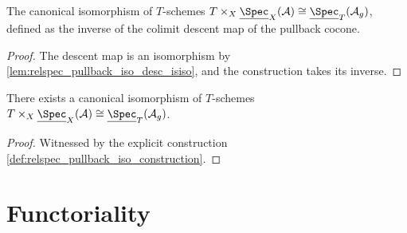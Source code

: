 \begin{definition}
  \label{def:relspec_pullback_iso_construction}
  The canonical isomorphism of \(T\)-schemes
  \(T \times_X \underline{\Spec}_X(\mathcal{A}) \cong
    \underline{\Spec}_T(\mathcal{A}_g)\),
  defined as the inverse of the colimit descent map of the pullback cocone.
\end{definition}

\begin{proof}
  The descent map is an isomorphism by \cref{lem:relspec_pullback_iso_desc_isiso}, and
  the construction takes its inverse.
\end{proof}

\begin{lemma}
  \label{lem:relspec_pullback_iso}
  There exists a canonical isomorphism of \(T\)-schemes
  \(T \times_X \underline{\Spec}_X(\mathcal{A}) \cong
    \underline{\Spec}_T(\mathcal{A}_g)\).
\end{lemma}

\begin{proof}
  Witnessed by the explicit construction
  \cref{def:relspec_pullback_iso_construction}.
\end{proof}

\section{Functoriality}
\label{sec:relspec_functoriality}


